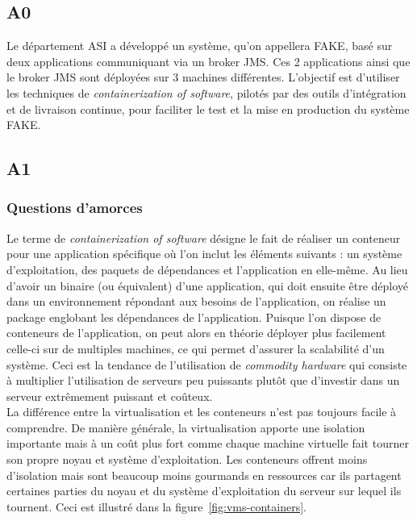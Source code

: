 \subsection*{A0}
Le département ASI a développé un système, qu'on appellera FAKE, basé sur deux applications communiquant via un broker JMS. Ces 2 applications ainsi que le broker JMS sont déployées sur 3 machines différentes. L'objectif est d'utiliser les techniques de \textit{containerization of software}, pilotés par des outils d'intégration et de livraison continue, pour faciliter le test et la mise en production du système FAKE.

\subsection*{A1}
    \subsubsection*{Questions d'amorces}
    Le terme de \textit{containerization of software} désigne le fait de réaliser un conteneur pour une application spécifique où l'on inclut les éléments suivants : un système d'exploitation, des paquets de dépendances et l'application en elle-même. Au lieu d'avoir un binaire (ou équivalent) d'une application, qui doit ensuite être déployé dans un environnement répondant aux besoins de l'application, on réalise un package englobant les dépendances de l'application. Puisque l'on dispose de conteneurs de l'application, on peut alors en théorie déployer plus facilement celle-ci sur de multiples machines, ce qui permet d'assurer la scalabilité d'un système. Ceci est la tendance de l'utilisation de \textit{commodity hardware} qui consiste à multiplier l'utilisation de serveurs peu puissants plutôt que d'investir dans un serveur extrêmement puissant et coûteux.\\

    La différence entre la virtualisation et les conteneurs n'est pas toujours facile à comprendre. De manière générale, la virtualisation apporte une isolation importante mais à un coût plus fort comme chaque machine virtuelle fait tourner son propre noyau et système d'exploitation. Les conteneurs offrent moins d'isolation mais sont beaucoup moins gourmands en ressources car ils partagent certaines parties du noyau et du système d'exploitation du serveur sur lequel ils tournent. Ceci est illustré dans la figure~\ref{fig:vms-containers}.\\

